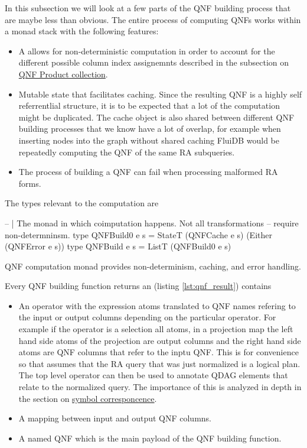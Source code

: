 In this subsection we will look at a few parts of the QNF building
process that are maybe less than obvious. The entire process of
computing QNFs works within a monad stack with the following features:

\begin{itemize}
\item A  allows for non-deterministic computation in order to
  account for the different possible column index assignemnts
  described in the subsection on \hyperref[sec:org86e5e2d]{QNF Product collection}.
\item Mutable state that facilitates caching. Since the resulting QNF is a
  highly self referrentlial structure, it is to be expected that a lot
  of the computation might be duplicated. The cache object is also
  shared between different QNF building processes that we know have a
  lot of overlap, for example when inserting nodes into the graph
  without shared caching FluiDB would be repeatedly computing the QNF
  of the same RA subqueries.
\item The process of building a QNF can fail when processing malformed RA
  forms.
\end{itemize}

The types relevant to the computation are

\begin{code}
  \begin{haskellcode}
    -- | The monad in which coimputation happens. Not all transformations
    -- require non-determninsm.
    type QNFBuild0 e s = StateT (QNFCache e s) (Either (QNFError e s))
    type QNFBuild e s = ListT (QNFBuild0 e s)
  \end{haskellcode}
  \caption{QNF computation monad provides non-determinism, caching,
    and error handling.}
\end{code}

Every QNF building function returns an  (listing
\ref{lst:qnf_result}) contains

\begin{itemize}
\item An operator with the expression atoms translated to QNF names
  refering to the input or output columns depending on the particular
  operator. For example if the operator is a selection all atoms, in a
  projection map the left hand side atoms of the projection are output
  columns and the right hand side atoms are QNF columns that refer to
  the inptu QNF. This is for convenience so that assumes that the RA
  query that was just normalized is a logical plan. The top level
  operator can then be used to annotate QDAG elements that relate to
  the normalized query. The importance of this is analyzed in depth in
  the section on \hyperref[sec:orgcc899ec]{symbol corresponcence}.
\item A mapping between input and output QNF columns.
\item A  named QNF which is the main payload of the QNF building function.
\end{itemize}

